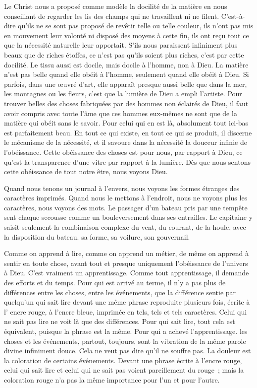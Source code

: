 \documentclass[french,twoside]{book} %
\begin{document}
Le Christ nous a proposé comme modèle la docilité de la matière en nous conseillant de regarder les lis des champs qui ne travaillent ni ne filent. C'est-à-dire qu'ils ne se sont pas proposé de revêtir telle ou telle couleur, ils n'ont pas mis en mouvement leur volonté ni disposé des moyens à cette fin, ils ont reçu tout ce que la nécessité naturelle leur apportait. S'ils nous paraissent infiniment plus beaux que de riches étoffes, ce n'est pas qu'ils soient plus riches, c'est par cette docilité. Le tissu aussi est docile, mais docile à l'homme, non à Dieu. La matière n'est pas belle quand elle obéit à l'homme, seulement quand elle obéit à Dieu. Si parfois, dans une œuvré d'art, elle apparaît presque aussi belle que dans la mer, les montagnes ou les fleurs, c'est que la lumière de Dieu a empli l'artiste. Pour trouver belles des choses fabriquées par des hommes non éclairés de Dieu, il faut avoir compris avec toute l'âme que ces hommes eux-mêmes ne sont que de la matière qui obéit sans le savoir. Pour celui qui en est là, absolument tout ici-bas est parfaitement beau. En tout ce qui existe, en tout ce qui se produit, il discerne le mécanisme de la nécessité, et il savoure dans la nécessité la douceur infinie de l'obéissance. Cette obéissance des choses est pour nous, par rapport à Dieu, ce qu'est la transparence d'une vitre par rapport à la lumière. Dès que nous sentons cette obéissance de tout notre être, nous voyons Dieu.\par
Quand nous tenons un journal à l'envers, nous voyons les formes étranges des caractères imprimés. Quand nous le mettons à l'endroit, nous ne voyons plus les caractères, nous voyons des mots. Le passager d'un bateau pris par une tempête sent chaque secousse comme un bouleversement dans ses entrailles. Le capitaine y saisit seulement la combinaison complexe du vent, du courant, de la houle, avec la disposition du bateau. sa forme, sa voilure, son gouvernail.\par
Comme on apprend à lire, comme on apprend un métier, de même on apprend à sentir en toute chose, avant tout et presque uniquement l'obéissance de l'univers à Dieu. C'est vraiment un apprentissage. Comme tout apprentissage, il demande des efforts et du temps. Pour qui est arrivé au terme, il n'y a pas plus de différences entre les choses, entre les événements, que la différence sentie par quelqu'un qui sait lire devant une même phrase reproduite plusieurs fois, écrite à l' encre rouge, à l'encre bleue, imprimée en tels, tels et tels caractères. Celui qui ne sait pas lire ne voit là que des différences. Pour qui sait lire, tout cela est équivalent, puisque la phrase est la même. Pour qui a achevé l'apprentissage. les choses et les événements, partout, toujours, sont la vibration de la même parole divine infiniment douce. Cela ne veut pas dire qu'il ne souffre pas. La douleur est la coloration de certains événements. Devant une phrase écrite à l'encre rouge, celui qui sait lire et celui qui ne sait pas voient pareillement du rouge ; mais la coloration rouge n'a pas la même importance pour l'un et pour l'autre.\par
\end{document}
